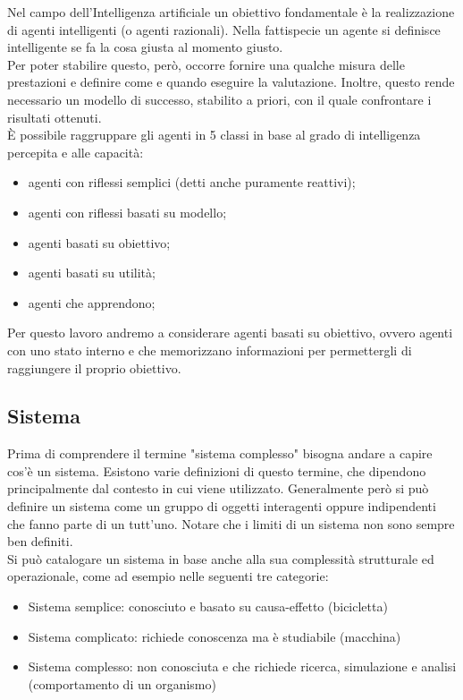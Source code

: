 \documentclass[12pt]{article}
\begin{document}
\noindent Nel campo dell’Intelligenza artificiale un obiettivo fondamentale è la realizzazione di agenti intelligenti (o agenti razionali). Nella fattispecie un agente si definisce intelligente se fa la cosa giusta al momento giusto. \\
Per poter stabilire questo, però, occorre fornire una qualche misura delle prestazioni e definire come e quando eseguire la valutazione. Inoltre, questo rende necessario un modello di successo, stabilito a priori, con il quale confrontare i risultati ottenuti. \cite{AgenteIntelligente} \\
È possibile raggruppare gli agenti in 5 classi in base al grado di intelligenza percepita e alle capacità:
\label{Agente}
\begin{itemize}
\item agenti con riflessi semplici (detti anche puramente reattivi);
\item agenti con riflessi basati su modello;
\item agenti basati su obiettivo;
\item agenti basati su utilità;
\item agenti che apprendono;
\end{itemize}

\noindent Per questo lavoro andremo a considerare agenti basati su obiettivo, ovvero agenti con uno stato interno e che memorizzano informazioni per permettergli di raggiungere il proprio obiettivo. 

\subsection{Sistema}
Prima di comprendere il termine "sistema complesso" bisogna andare a capire cos'è un sistema. Esistono varie definizioni di questo termine, che dipendono principalmente dal contesto in cui viene utilizzato. Generalmente però si può definire un sistema come un gruppo di oggetti interagenti oppure indipendenti che fanno parte di un tutt'uno. Notare che i limiti di un sistema non sono sempre ben definiti.\\
Si può catalogare un sistema in base anche alla sua complessità strutturale ed operazionale, come ad esempio nelle seguenti tre categorie:
\begin{itemize}
\item Sistema semplice: conosciuto e basato su causa-effetto (bicicletta)
\item Sistema complicato: richiede conoscenza ma è studiabile (macchina)
\item Sistema complesso: non conosciuta e che richiede ricerca, simulazione e analisi (comportamento di un organismo)
\end{itemize}
\end{document}
